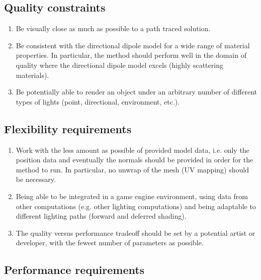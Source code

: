 \subsection{Quality constraints}
 \label{sec:quality}
\begin{enumerate}
	\item Be visually close as much as possible to a path traced solution.
	\item Be consistent with the directional dipole model for a wide range of material properties. In particular, the method should perform well in the domain of quality where the directional dipole model excels (highly scattering materials).
	\item Be potentially able to render an object under an arbitrary number of different types of lights (point, directional, environment, etc.).
\end{enumerate}

\subsection{Flexibility requirements}	
\begin{enumerate}
	\item Work with the less amount as possible of provided model data, i.e. only the position data and eventually the normals should be provided in order for the method to run. In particular, no unwrap of the mesh (UV mapping) should be necessary. 
	\item Being able to be integrated in a game engine environment, using data from other computations (e.g. other lighting computations) and being adaptable to different lighting paths (forward and deferred shading).
  \item The quality versus performance tradeoff should be set by a potential artist or developer, with the fewest number of parameters as possible.
\end{enumerate}

\subsection{Performance requirements}

